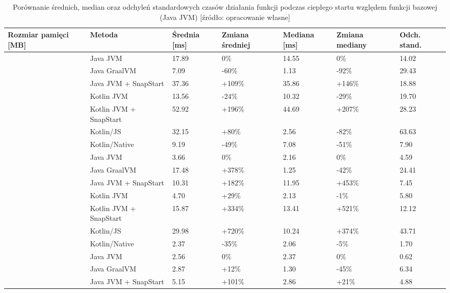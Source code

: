 \newpage

\begin{table}[!h]
\centering
\caption{Porównanie średnich, median oraz odchyleń standardowych czasów działania funkcji podczas ciepłego startu względem funkcji bazowej (Java JVM) [źródło: opracowanie własne]}
\small
\begin{tabular}{|>{\centering\arraybackslash}m{1.5cm}|l|p{1.5cm}|p{1.5cm}|p{1.5cm}|p{1.5cm}|p{1.5cm}|}
\toprule
Rozmiar pamięci [MB] & Metoda & Średnia [ms] & Zmiana średniej & Mediana [ms] & Zmiana mediany & Odch. stand. \\
\midrule
\multirow{7}{*}{128} & Java JVM & 17.89 & \mbox{0\%} & 14.55 & \mbox{0\%} & 14.02 \\
 & Java GraalVM & 7.09 & \mbox{-60\%} & 1.13 & \mbox{-92\%} & 29.43 \\
 & Java JVM + SnapStart & 37.36 & \mbox{+109\%} & 35.86 & \mbox{+146\%} & 18.88 \\
 & Kotlin JVM & 13.56 & \mbox{-24\%} & 10.32 & \mbox{-29\%} & 19.70 \\
 & Kotlin JVM + SnapStart & 52.92 & \mbox{+196\%} & 44.69 & \mbox{+207\%} & 28.23 \\
 & Kotlin/JS & 32.15 & \mbox{+80\%} & 2.56 & \mbox{-82\%} & 63.63 \\
 & Kotlin/Native & 9.19 & \mbox{-49\%} & 7.08 & \mbox{-51\%} & 7.90 \\
\midrule
\multirow{7}{*}{256} & Java JVM & 3.66 & \mbox{0\%} & 2.16 & \mbox{0\%} & 4.59 \\
 & Java GraalVM & 17.48 & \mbox{+378\%} & 1.25 & \mbox{-42\%} & 24.41 \\
 & Java JVM + SnapStart & 10.31 & \mbox{+182\%} & 11.95 & \mbox{+453\%} & 7.45 \\
 & Kotlin JVM & 4.70 & \mbox{+29\%} & 2.13 & \mbox{-1\%} & 5.80 \\
 & Kotlin JVM + SnapStart & 15.87 & \mbox{+334\%} & 13.41 & \mbox{+521\%} & 12.12 \\
 & Kotlin/JS & 29.98 & \mbox{+720\%} & 10.24 & \mbox{+374\%} & 43.71 \\
 & Kotlin/Native & 2.37 & \mbox{-35\%} & 2.06 & \mbox{-5\%} & 1.70 \\
\midrule
\multirow{7}{*}{512} & Java JVM & 2.56 & \mbox{0\%} & 2.37 & \mbox{0\%} & 0.62 \\
 & Java GraalVM & 2.87 & \mbox{+12\%} & 1.30 & \mbox{-45\%} & 6.34 \\
 & Java JVM + SnapStart & 5.15 & \mbox{+101\%} & 2.86 & \mbox{+21\%} & 4.88 \\

\end{tabular}
\end{table}
